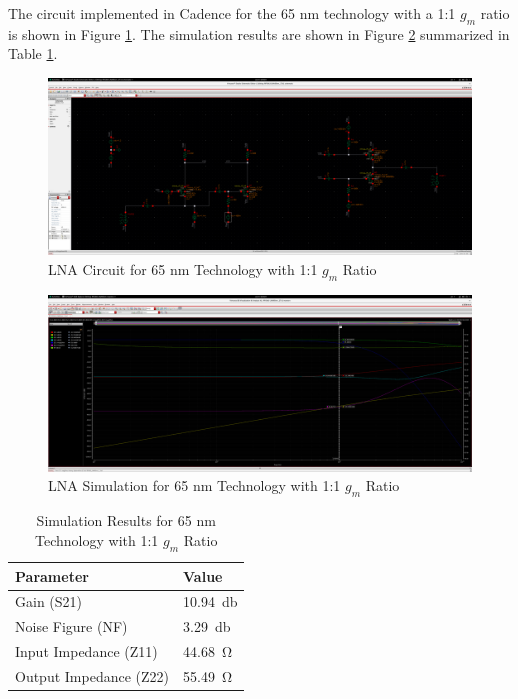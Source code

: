 The circuit implemented in Cadence for the 65 nm technology with a 1:1 $g_m$ ratio is shown in Figure \ref{fig:65nm_1to1-circ}. The simulation results are shown in Figure \ref{fig:65nm_1to1} summarized in Table \ref{tab:65nm_1to1_results}.
\begin{figure}[H]
    \centering
    \includegraphics[width=1\textwidth]{Images/65nm1To1Circ.png}
    \caption{LNA Circuit for 65 nm Technology with 1:1 $g_m$ Ratio}
    \label{fig:65nm_1to1-circ}
\end{figure}

\begin{figure}[H]
    \centering
    \includegraphics[width=1\textwidth]{Images/65nm1to1.png}
    \caption{LNA Simulation for 65 nm Technology with 1:1 $g_m$ Ratio}
    \label{fig:65nm_1to1}
\end{figure}

\begin{table}[H]
    \centering
    \caption{Simulation Results for 65 nm Technology with 1:1 $g_m$ Ratio}
    \begin{tabularx}{\textwidth}{>{\centering\arraybackslash}X >{\centering\arraybackslash}X }
        \toprule
        \textbf{Parameter} & \textbf{Value}\\
        \midrule
        Gain (S21) & \SI{10.94}{\decibel} \\
        \midrule
        Noise Figure (NF) & \SI{3.29}{\decibel} \\
        \midrule
        Input Impedance (Z11) & \SI{44.68}{\ohm} \\
        \midrule
        Output Impedance (Z22) & \SI{55.49}{\ohm} \\
        \bottomrule
    \end{tabularx}
    \label{tab:65nm_1to1_results}
\end{table}


